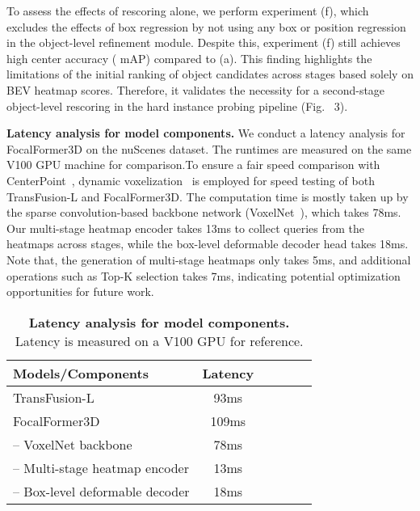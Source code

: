 \documentclass[10pt,twocolumn,letterpaper]{article}
\begin{document}
To assess the effects of rescoring alone, we perform experiment (f), which excludes the effects of box regression by not using any box or position regression in the object-level refinement module. Despite this, experiment (f) still achieves high center accuracy ( mAP) compared to (a). This finding highlights the limitations of the initial ranking of object candidates across stages based solely on BEV heatmap scores. Therefore, it validates the necessity for a second-stage object-level rescoring in the hard instance probing pipeline (Fig.~{\color{red} 3}). 



\vspace{2mm}
\noindent\textbf{Latency analysis for model components.}
We conduct a latency analysis for FocalFormer3D on the nuScenes dataset. The runtimes are measured on the same V100 GPU machine for comparison.To ensure a fair speed comparison with CenterPoint~\cite{centerpoint}, dynamic voxelization~\cite{dynamicvoxelization} is employed for speed testing of both TransFusion-L and FocalFormer3D. The computation time is mostly taken up by the sparse convolution-based backbone network (VoxelNet~\cite{VoxelNet, second}), which takes 78ms. Our multi-stage heatmap encoder takes 13ms to collect queries from the heatmaps across stages, while the box-level deformable decoder head takes 18ms. Note that, the generation of multi-stage heatmaps only takes 5ms, and additional operations such as Top-K selection takes 7ms, indicating potential optimization opportunities for future work.
\begin{table}[bpt]
	\begin{center}
\begin{tabular}{lccccc}
		\toprule
		 Models/Components & Latency  \\ \midrule
            TransFusion-L & 93ms \\ \midrule
            FocalFormer3D & 109ms \\ 
            --   VoxelNet backbone & 78ms \\
            --   Multi-stage heatmap encoder & 13ms \\
            --   Box-level deformable decoder & 18ms \\
            \bottomrule
		\end{tabular}
	\end{center}
	\caption{\textbf{Latency analysis for model components.} Latency is measured on a V100 GPU for reference. }\label{tab:latency comparison}
\end{table}
\end{document}
